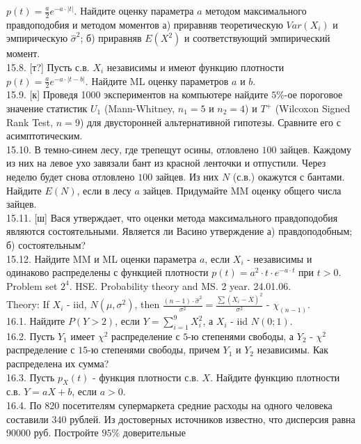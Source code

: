 \documentclass[pdftex,12pt,a4paper]{article}
\begin{document}
$p(t)=\frac{a}{2}e^{-a\cdot |t|}$. Найдите оценку параметра $a$
методом максимального правдоподобия и методом моментов а)
приравняв теоретическую $Var(X_{i})$ и эмпирическую
$\widehat{\sigma}^{2}$; б) приравняв $E(X^{2})$ и соответствующий
эмпирический момент. \\
15.8. [т?] Пусть с.в. $X_{i}$ независимы и имеют функцию плотности
$p(t)=\frac{a}{2}e^{-a\cdot |t-b|}$. Найдите ML оценку параметров
$a$ и $b$. \\
15.9. [к] Проведя 1000 экспериментов на компьютере найдите
$5\%$-ое пороговое значение статистик $U_{1}$ (Mann-Whitney,
$n_{1}=5$ и $n_{2}=4$) и $T^{+}$ (Wilcoxon Signed Rank Test,
$n=9$) для двусторонней альтернативной гипотезы. Сравните его с
асимптотическим. \\
15.10. В темно-синем лесу, где трепещут осины, отловлено $100$
зайцев. Каждому из них на левое ухо завязали бант из красной
ленточки и отпустили. Через неделю будет снова отловлено $100$
зайцев. Из них $N$ (с.в.) окажутся с бантами. Найдите $E(N)$, если
в лесу $a$ зайцев. Придумайте MM оценку общего числа зайцев. \\
15.11. [ш] Вася утверждает, что оценки метода максимального
правдоподобия являются состоятельными. Является ли Васино
утверждение а) правдоподобным; б) состоятельным? \\
15.12. Найдите MM и ML оценки параметра $a$, если $X_{i}$ -
независимы и одинаково распределены с функцией плотности
$p(t)=a^{2}\cdot t\cdot e^{-a\cdot t}$ при $t>0$. \\
\newpage
Problem set $2^4$. HSE. Probability theory and MS. 2 year. 24.01.06.\\
Theory: If $X_{i}$ - iid, $N(\mu,\sigma^{2})$, then
$\frac{(n-1)\cdot\hat{\sigma}^{2}}{\sigma^{2}}=
\frac{\sum (X_{i}-\overline{X})^{2}}{\sigma^{2}}$ - $\chi_{(n-1)}$. \\
16.1. Найдите $P(Y>2)$, если $Y=\sum_{i=1}^{9} X_{i}^{2}$, а
$X_{i}$ - iid $N(0;1)$. \\
16.2. Пусть $Y_{1}$ имеет $\chi^{2}$ распределение с $5$-ю
степенями свободы, а $Y_{2}$ - $\chi^{2}$ распределение с $15$-ю
степенями свободы, причем $Y_{1}$ и $Y_{2}$ независимы. Как
распределена их сумма? \\
16.3. Пусть $p_{X}(t)$ - функция плотности с.в. $X$. Найдите
функцию плотности с.в. $Y=aX+b$, если $a>0$. \\
16.4. По 820 посетителям супермаркета средние расходы на одного
человека составили 340 рублей. Из достоверных источников известно,
что дисперсия равна 90000 руб. Постройте $95\%$ доверительные
\end{document}
